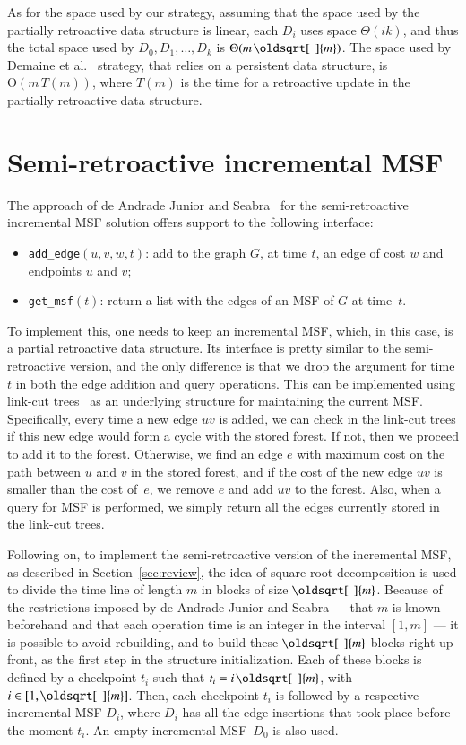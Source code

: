 \documentclass[3p,times,procedia]{elsarticle}
\renewcommand{\sqrt}[2][\mkern8mu]{\mkern-1mu\mathop{\oldsqrt[#1]{#2}}}
\newcommand{\Oh}{\mathrm{O}}
\begin{document}
\medskip 

As for the space used by our strategy, assuming that the space used by the 
partially retroactive data structure is linear, each $D_i$ uses space $\Theta(ik)$, 
and thus the total space used by $D_0,D_1,\ldots,D_k$ is $\Theta(m\sqrt{m})$. 
The space used by Demaine et al.~\cite{DemaineIL2007} strategy, that relies 
on a persistent data structure, is $\Oh(m\,T(m))$, where $T(m)$ is the time 
for a retroactive update in the partially retroactive data structure. 

\section{Semi-retroactive incremental MSF}\label{sec:incMSF}

The approach of de Andrade Junior and Seabra~\cite{deAndradeJrS2022} for the 
semi-retroactive incremental MSF solution offers support to the following interface:
\begin{itemize}
\item \texttt{add\_edge}$(u,v,w,t)$: add to the graph $G$, at time $t$,
  an edge of cost $w$ and endpoints $u$ and $v$;
\item \texttt{get\_msf}$(t)$: return a list with the edges of an MSF of $G$ at
  time~$t$.
\end{itemize}

To implement this, one needs to keep an incremental MSF, which, in
this case, is a partial retroactive data structure. Its interface is
pretty similar to the semi-retroactive version, and the only difference
is that we drop the argument for time $t$ in both the edge addition and 
query operations. This can be implemented using link-cut trees~\cite{SleatorT1981} 
as an underlying structure for maintaining the current MSF. Specifically, 
every time a new edge $uv$ is added, we can check in the link-cut trees if 
this new edge would form a cycle with the stored forest. If not, then we 
proceed to add it to the forest.  
Otherwise, we find an edge $e$ with maximum cost on the path between $u$ 
and $v$ in the stored forest, and if the cost of the new edge $uv$ is smaller 
than the cost of~$e$, we remove $e$ and add $uv$ to the forest.
Also, when a query for MSF is performed, 
we simply return all the edges currently stored in the link-cut trees.

Following on, to implement the semi-retroactive version of the incremental MSF, 
as described in Section~\ref{sec:review}, the idea of square-root decomposition 
is used to divide the time line of length $m$ in blocks of size $\sqrt{m}$. 
Because of the restrictions imposed by de Andrade Junior and Seabra --- 
that $m$ is known beforehand and that each operation time is an integer in 
the interval $[1, m]$ --- it is possible to avoid rebuilding, and to build 
these $\sqrt{m}$ blocks right up front, as the first step in the structure 
initialization.  Each of these blocks is defined by a checkpoint $t_i$ such 
that $t_i = i \sqrt{m}$, with $i \in [1, \sqrt{m}]$. Then, each checkpoint 
$t_i$ is followed by a respective incremental MSF $D_i$, where $D_i$ has 
all the edge insertions that took place before the moment $t_i$.
An empty incremental MSF~$D_0$ is also used.
\end{document}

